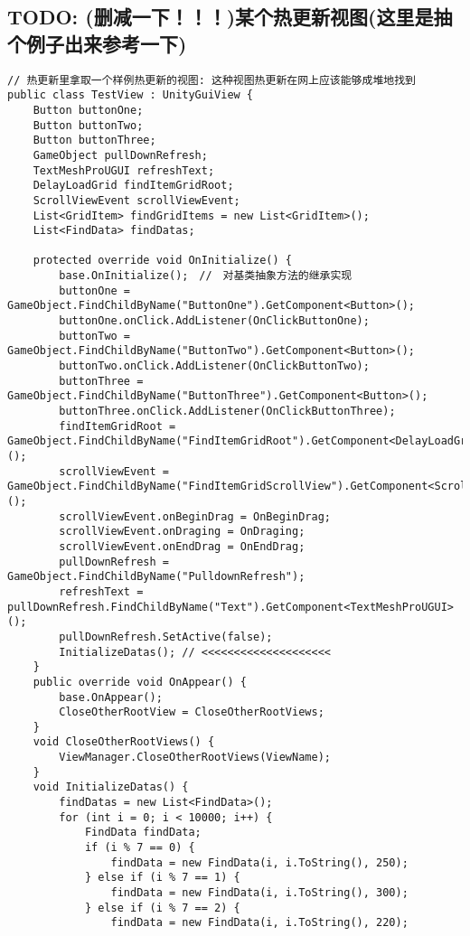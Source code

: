 \documentclass[9pt, b5paper]{article}
\begin{document}
\subsection{TODO: (删减一下！！！)某个热更新视图(这里是抽个例子出来参考一下)}
\label{sec-3-1}
\begin{verbatim}
// 热更新里拿取一个样例热更新的视图: 这种视图热更新在网上应该能够成堆地找到
public class TestView : UnityGuiView {
    Button buttonOne;
    Button buttonTwo;
    Button buttonThree;
    GameObject pullDownRefresh;
    TextMeshProUGUI refreshText;
    DelayLoadGrid findItemGridRoot;
    ScrollViewEvent scrollViewEvent;
    List<GridItem> findGridItems = new List<GridItem>();
    List<FindData> findDatas;

    protected override void OnInitialize() {
        base.OnInitialize();　//　对基类抽象方法的继承实现　
        buttonOne = GameObject.FindChildByName("ButtonOne").GetComponent<Button>();
        buttonOne.onClick.AddListener(OnClickButtonOne);
        buttonTwo = GameObject.FindChildByName("ButtonTwo").GetComponent<Button>();
        buttonTwo.onClick.AddListener(OnClickButtonTwo);
        buttonThree = GameObject.FindChildByName("ButtonThree").GetComponent<Button>();
        buttonThree.onClick.AddListener(OnClickButtonThree);
        findItemGridRoot = GameObject.FindChildByName("FindItemGridRoot").GetComponent<DelayLoadGrid>();
        scrollViewEvent = GameObject.FindChildByName("FindItemGridScrollView").GetComponent<ScrollViewEvent>();
        scrollViewEvent.onBeginDrag = OnBeginDrag;
        scrollViewEvent.onDraging = OnDraging;
        scrollViewEvent.onEndDrag = OnEndDrag;
        pullDownRefresh = GameObject.FindChildByName("PulldownRefresh");
        refreshText = pullDownRefresh.FindChildByName("Text").GetComponent<TextMeshProUGUI>();
        pullDownRefresh.SetActive(false);
        InitializeDatas(); // <<<<<<<<<<<<<<<<<<<< 
    }
    public override void OnAppear() {
        base.OnAppear();
        CloseOtherRootView = CloseOtherRootViews;
    }
    void CloseOtherRootViews() {
        ViewManager.CloseOtherRootViews(ViewName);
    }
    void InitializeDatas() {
        findDatas = new List<FindData>();
        for (int i = 0; i < 10000; i++) {
            FindData findData;
            if (i % 7 == 0) {
                findData = new FindData(i, i.ToString(), 250);
            } else if (i % 7 == 1) {
                findData = new FindData(i, i.ToString(), 300);
            } else if (i % 7 == 2) {
                findData = new FindData(i, i.ToString(), 220);

\end{verbatim}
\end{document}
